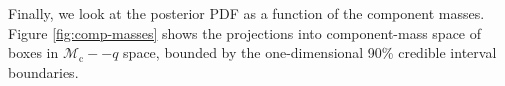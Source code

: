 Finally, we look at the posterior PDF as a function of the component masses.  Figure \ref{fig:comp-masses} shows the projections into component-mass space of boxes in $\mathcal{M}_\mathrm{c}--q$ space, bounded by the one-dimensional 90\% credible interval boundaries.